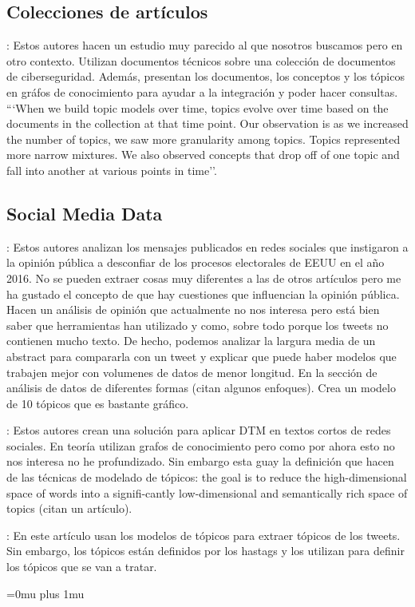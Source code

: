\documentclass[a4paper,10pt]{article}
\begin{document}
\subsection{Colecciones de artículos}
\cite{Sleeman2021}: Estos autores hacen un estudio muy parecido al que nosotros buscamos pero en otro contexto. Utilizan documentos técnicos sobre una colección de documentos de ciberseguridad. Además, presentan los documentos, los conceptos y los tópicos en gráfos de conocimiento para ayudar a la integración y poder hacer consultas.  ```When we build topic models over time, topics evolve over time based on the documents in the collection at that time point. Our observation is as we increased the number of topics, we saw more granularity among topics. Topics represented more narrow mixtures. We also observed concepts that drop off of one topic and fall into another at various points in time''.


\subsection{Social Media Data}
\cite{Golino2022}: Estos autores analizan los mensajes publicados en redes sociales que instigaron a la opinión pública a desconfiar de los procesos electorales de EEUU en el año 2016. No se pueden extraer cosas muy diferentes a las de otros artículos pero me ha gustado el concepto de que hay cuestiones que influencian la opinión pública. Hacen un análisis de opinión que actualmente no nos interesa pero está bien saber que herramientas han utilizado y como, sobre todo porque los tweets no contienen mucho texto. De hecho, podemos analizar la largura media de un abstract para compararla con un tweet y explicar que puede haber modelos que trabajen mejor con volumenes de datos de menor longitud. En la sección de análisis de datos de diferentes formas (citan algunos enfoques). Crea un modelo de 10 tópicos que es bastante gráfico.

\cite{Ghoorchian2020}: Estos autores crean una solución para aplicar DTM en textos cortos de redes sociales. En teoría utilizan grafos de conocimiento pero como por ahora esto no nos interesa no he profundizado. Sin embargo esta guay la definición que hacen de las técnicas de modelado de tópicos: the goal is to reduce the high-dimensional space of words into a signifi-cantly low-dimensional and semantically rich space of topics (citan un artículo).


\cite{Tabassum2021}: En este artículo usan los modelos de tópicos para extraer tópicos de los tweets. Sin embargo, los tópicos están definidos por los hastags y los utilizan para definir los tópicos que se van a tratar.






\Urlmuskip=0mu plus 1mu

\end{document}

